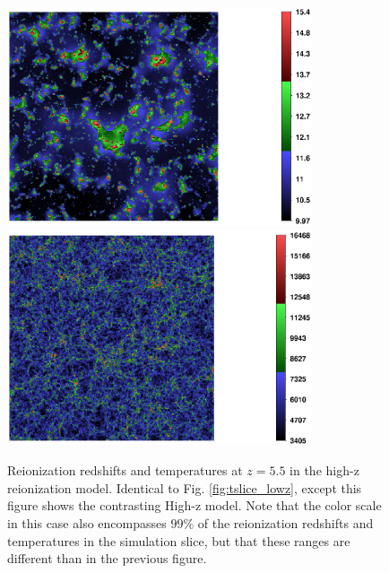 \begin{figure}[t]
\bc
\includegraphics[width=9cm]{f4a.ps}
\includegraphics[width=9cm]{f4b.ps}
\caption{Reionization redshifts and temperatures at $z=5.5$ in the high-z reionization model. Identical to Fig. \ref{fig:tslice_lowz},
except this figure shows the contrasting High-z model. Note that the color scale in this case also encompasses $99\%$ of the reionization
redshifts and temperatures in the simulation slice, but that these ranges are different than in the previous figure.}
\label{fig:tslice_highz}
\ec
\end{figure}

